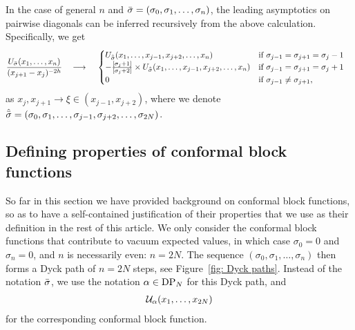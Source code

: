 \documentclass[oneside,english]{amsart}
\numberwithin{equation}{section}
\numberwithin{figure}{section}
\theoremstyle{plain}
\theoremstyle{plain}
\theoremstyle{plain}
\theoremstyle{remark}
\theoremstyle{plain}
\theoremstyle{plain}
\theoremstyle{plain}
\theoremstyle{plain}
\theoremstyle{plain}
\theoremstyle{plain}
\theoremstyle{plain}
\theoremstyle{plain}
\newcommand{\blue}[1]{{\color{blue} #1}}
\begin{document}
In the case of general $n$ and $\bar{\sigma}=(\sigma_{0},\sigma_{1},\ldots,\sigma_{n})$,
the leading asymptotics on pairwise diagonals can be inferred recursively from the above calculation. 
Specifically, we get %
\begin{align*}
\frac{U_{\bar{\sigma}}(x_{1},\ldots,x_{n})}{(x_{j+1}-x_{j})^{-2h}}\quad \longrightarrow \quad\; & \begin{cases}
U_{\hat{\bar{\sigma}}}(x_{1},\ldots,x_{j-1},x_{j+2},\ldots,x_{n}) & \text{if $\sigma_{j-1} = \sigma_{j+1} = \sigma_j -1$}\\
-\frac{\left[\sigma_{j}+1\right]}{\left[\sigma_{j}+2\right]}\times U_{\hat{\bar{\sigma}}}(x_{1},\ldots,x_{j-1},x_{j+2},\ldots,x_{n}) & \text{if $\sigma_{j-1} = \sigma_{j+1} = \sigma_j +1$}\\
0 & \text{if $\sigma_{j-1} \neq \sigma_{j+1}$} ,
\end{cases}
\end{align*}
as $x_{j},x_{j+1}\to\xi\in(x_{j-1},x_{j+2})$,
where we denote
$\hat{\bar{\sigma}} = (\sigma_0, \sigma_1, \ldots, \sigma_{j-1}, \sigma_{j+2}, \ldots, \sigma_{2N})$.

\subsection{Defining properties of conformal block functions}
\label{sub: defining conformal block functions}

So far in this section we have provided background on conformal block functions, so as to
have a self-contained justification of their properties that we use as their
definition %
in the rest of this article.
We %
only consider the conformal block functions that contribute to
vacuum expected values, in which case $\sigma_0 = 0$ and $\sigma_n = 0$,
and $n$ is necessarily even: $n=2N$. The sequence
$(\sigma_0 , \sigma_1 , \ldots, \sigma_n)$ then forms a Dyck path
of $n=2N$ steps, see Figure~\ref{fig: Dyck paths}.
Instead of the notation $\bar{\sigma}$, we use the notation $\alpha \in \mathrm{DP}_N$ for this Dyck path, and
\begin{align*}
\mathcal{U}_\alpha (x_1 , \ldots , x_{2N})
\end{align*}
for the corresponding conformal block function.
\end{document}
